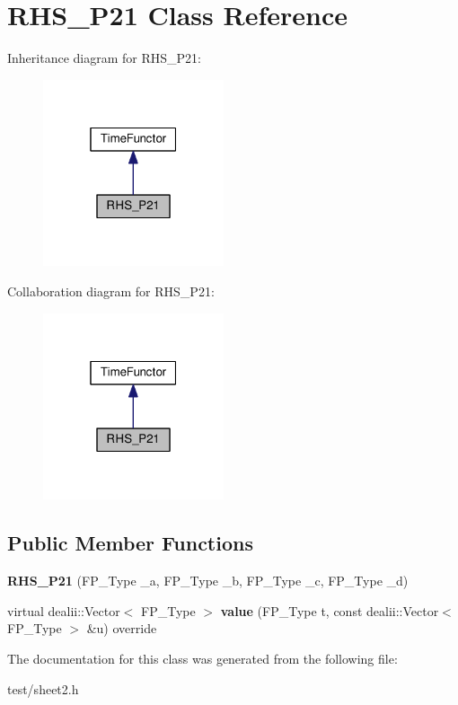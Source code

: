 \hypertarget{classRHS__P21}{}\section{R\+H\+S\+\_\+\+P21 Class Reference}
\label{classRHS__P21}


Inheritance diagram for R\+H\+S\+\_\+\+P21\+:\nopagebreak
\begin{figure}[H]
\begin{center}
\leavevmode
\includegraphics[width=151pt]{classRHS__P21__inherit__graph}
\end{center}
\end{figure}


Collaboration diagram for R\+H\+S\+\_\+\+P21\+:\nopagebreak
\begin{figure}[H]
\begin{center}
\leavevmode
\includegraphics[width=151pt]{classRHS__P21__coll__graph}
\end{center}
\end{figure}
\subsection*{Public Member Functions}
\begin{DoxyCompactItemize}
\item 
\mbox{\label{classRHS__P21_a005bf3aeeb4762e84129fc062338519e}} 
{\bfseries R\+H\+S\+\_\+\+P21} (F\+P\+\_\+\+Type \+\_\+a, F\+P\+\_\+\+Type \+\_\+b, F\+P\+\_\+\+Type \+\_\+c, F\+P\+\_\+\+Type \+\_\+d)
\item 
\mbox{\label{classRHS__P21_a8c826e247d5ad2df96b812304d9de5ff}} 
virtual dealii\+::\+Vector$<$ F\+P\+\_\+\+Type $>$ {\bfseries value} (F\+P\+\_\+\+Type t, const dealii\+::\+Vector$<$ F\+P\+\_\+\+Type $>$ \&u) override
\end{DoxyCompactItemize}


The documentation for this class was generated from the following file\+:\begin{DoxyCompactItemize}
\item 
test/sheet2.\+h\end{DoxyCompactItemize}
